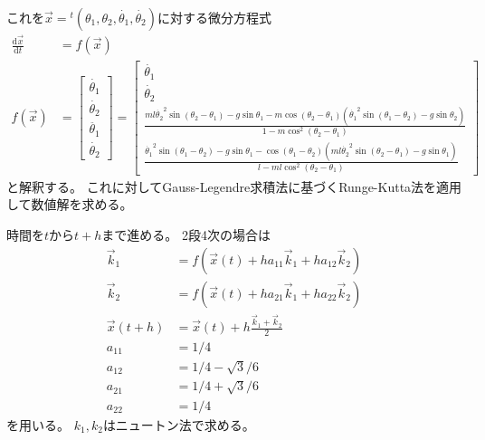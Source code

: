 \documentclass{jsarticle}
\newcommand{\eqa}[1]{\begin{align}#1\end{align}}
\newcommand{\fn}[1]{\!\left(#1\right)}
\newcommand{\cost}[2]{\cos\left(\theta_{#1}-\theta_{#2}\right)}
\newcommand{\coste}[3]{\cos^{#3}\left(\theta_{#1}-\theta_{#2}\right)}
\newcommand{\sint}[2]{\sin\left(\theta_{#1}-\theta_{#2}\right)}
\newcommand{\dott}[1]{\dot{\theta_{#1}}}
\newcommand{\ddott}[1]{\ddot{\theta_{#1}}}
\begin{document}
これを$\vec{x}={}^t\left(\theta_1, \theta_2, \dott{1}, \dott{2}\right)$に対する微分方程式
\eqa{
	\frac{\mathrm{d}\vec{x}}{\mathrm{d}t} &= f\fn{\vec{x}} \\
	f\fn{\vec{x}} &= \begin{bmatrix}
		\dott{1} \\ \dott{2} \\ \ddott{1} \\ \dott{2}
	\end{bmatrix}
	= \begin{bmatrix}
		\dott{1} \\ \dott{2} \\
		\frac{m l \dott{2}^2 \sint{2}{1} - g \sin\theta_1 - m \cost{2}{1}\left(\dott{1}^2 \sint{1}{2} - g \sin\theta_2\right)}{1 - m \coste{2}{1}{2}} \\
		\frac{\dott{1}^2 \sint{1}{2} - g \sin\theta_1 - \cost{1}{2}\left(m l \dott{2}^2 \sint{2}{1} - g \sin\theta_1\right)}{l - m l \coste{2}{1}{2}}
	\end{bmatrix}
}
と解釈する。
これに対してGauss-Legendre求積法に基づくRunge-Kutta法を適用して数値解を求める。

時間を$t$から$t+h$まで進める。
2段4次の場合は
\eqa{
	\vec{k}_1 &= f\fn{\vec{x}\fn{t} + h a_{11} \vec{k}_1 + h a_{12} \vec{k}_2} \\
	\vec{k}_2 &= f\fn{\vec{x}\fn{t} + h a_{21} \vec{k}_1+ h a_{22} \vec{k}_2} \\
	\vec{x}\fn{t + h} &= \vec{x}\fn{t} + h \frac{\vec{k}_1 + \vec{k}_2}{2} \\
	a_{11} &= 1 / 4 \\
	a_{12} &= 1 / 4 - \sqrt{3} / 6 \\
	a_{21} &= 1 / 4 + \sqrt{3} / 6 \\
	a_{22} &= 1 / 4
}
を用いる。
$k_1, k_2$はニュートン法で求める。




\end{document}
